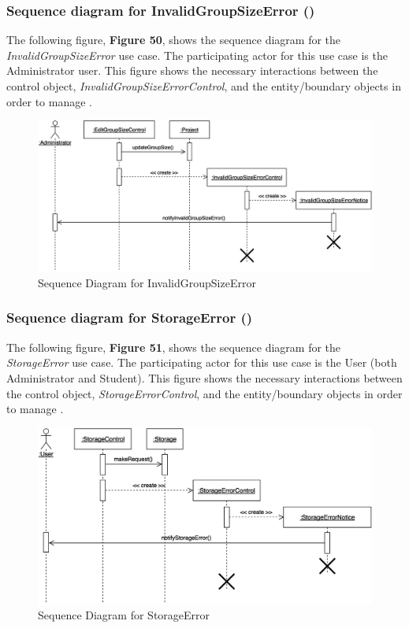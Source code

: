 \documentclass[12pt,letterpaper]{article}
\begin{document}
\subsubsection*{Sequence diagram for InvalidGroupSizeError (\invalidgroupsizeerror{})}

The following figure, {\bf Figure 50}, shows the sequence diagram for the {\it InvalidGroupSizeError} use case. The participating actor for this use case is
the Administrator user. This figure shows the necessary interactions between the control object, {\it InvalidGroupSizeErrorControl}, and the
entity/boundary objects in order to manage \invalidgroupsizeerror{}.

\begin{figure}[H]
	\centering{}
	\includegraphics[scale=0.3]{imgs/seq/invalid-group-size-error.png}
	\caption{Sequence Diagram for InvalidGroupSizeError}
\end{figure}

\subsubsection*{Sequence diagram for StorageError (\storageerror{})}

The following figure, {\bf Figure 51}, shows the sequence diagram for the {\it StorageError} use case. The participating actor for this use case is
the User (both Administrator and Student). This figure shows the necessary interactions between the control object, {\it StorageErrorControl}, and the
entity/boundary objects in order to manage \storageerror{}.

\begin{figure}[H]
	\centering{}
	\includegraphics[scale=0.3]{imgs/seq/storage-error.png}
	\caption{Sequence Diagram for StorageError}
\end{figure}
\end{document}
